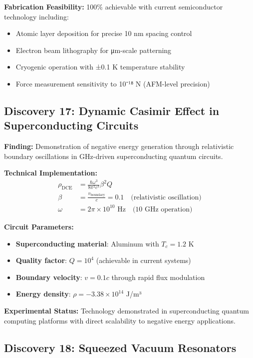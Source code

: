 \documentclass[11pt]{article}
\begin{document}
\textbf{Fabrication Feasibility:} 100\% achievable with current semiconductor technology including:
\begin{itemize}
    \item Atomic layer deposition for precise 10 nm spacing control
    \item Electron beam lithography for μm-scale patterning
    \item Cryogenic operation with ±0.1 K temperature stability
    \item Force measurement sensitivity to 10⁻¹⁸ N (AFM-level precision)
\end{itemize}

\subsection{Discovery 17: Dynamic Casimir Effect in Superconducting Circuits}

\textbf{Finding:} Demonstration of negative energy generation through relativistic boundary oscillations in GHz-driven superconducting quantum circuits.

\textbf{Technical Implementation:}
\begin{align}
\rho_{\text{DCE}} &= \frac{\hbar \omega^3}{8\pi^2 c^3} \beta^2 Q \\
\beta &= \frac{v_{\text{boundary}}}{c} = 0.1 \quad \text{(relativistic oscillation)} \\
\omega &= 2\pi \times 10^{10} \text{ Hz} \quad \text{(10 GHz operation)}
\end{align}

\textbf{Circuit Parameters:}
\begin{itemize}
    \item \textbf{Superconducting material}: Aluminum with $T_c = 1.2$ K
    \item \textbf{Quality factor}: $Q = 10^4$ (achievable in current systems)
    \item \textbf{Boundary velocity}: $v = 0.1c$ through rapid flux modulation
    \item \textbf{Energy density}: $\rho = -3.38 \times 10^{14}$ J/m³
\end{itemize}

\textbf{Experimental Status:} Technology demonstrated in superconducting quantum computing platforms with direct scalability to negative energy applications.

\subsection{Discovery 18: Squeezed Vacuum Resonators}
\end{document}
